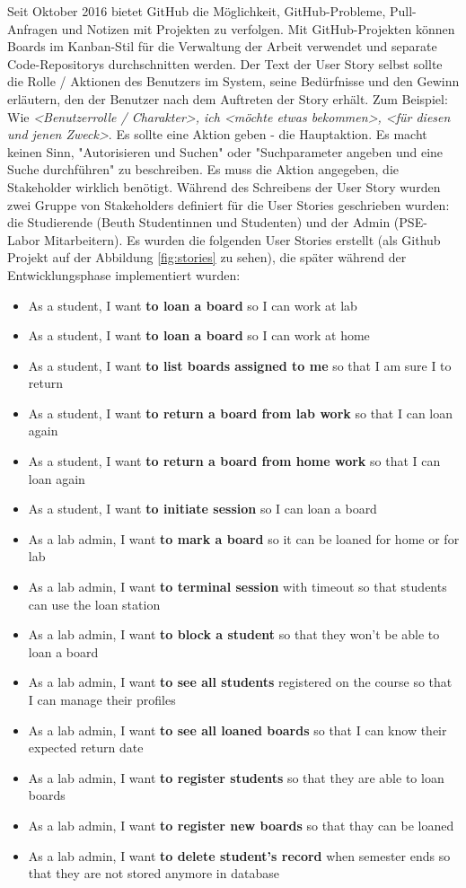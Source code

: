 Seit Oktober 2016 bietet GitHub die Möglichkeit, GitHub-Probleme, Pull-Anfragen und Notizen mit Projekten zu verfolgen\cite{website:18}. Mit GitHub-Projekten können Boards im Kanban-Stil für die Verwaltung der Arbeit verwendet und separate Code-Repositorys durchschnitten werden. Der Text der User Story selbst sollte die Rolle / Aktionen des Benutzers im System, seine Bedürfnisse und den Gewinn erläutern, den der Benutzer nach dem Auftreten der Story erhält. Zum Beispiel: Wie \textit{<Benutzerrolle / Charakter>, ich <möchte etwas bekommen>, <für diesen und jenen Zweck>}. Es sollte eine Aktion geben - die Hauptaktion. Es macht keinen Sinn, "Autorisieren und Suchen" oder "Suchparameter angeben und eine Suche durchführen" zu beschreiben. Es muss die Aktion angegeben, die Stakeholder wirklich benötigt. Während des Schreibens der User Story wurden zwei Gruppe von Stakeholders definiert für die User Stories geschrieben wurden: die Studierende (Beuth Studentinnen und Studenten) und der Admin (PSE-Labor Mitarbeitern). Es wurden die folgenden User Stories erstellt (als Github Projekt auf der Abbildung \ref*{fig:stories} zu sehen), die später während der Entwicklungsphase implementiert wurden:
\begin{itemize}
	\itemsep-1.2em 
	\item As a student, I want \textbf{to loan a board} so I can work at lab
	\item As a student, I want \textbf{to loan a board} so I can work at home
	\item As a student, I want \textbf{to list boards assigned to me} so that I am sure I to return
	\item As a student, I want \textbf{to return a board from lab work} so that I can loan again
	\item As a student, I want \textbf{to return a board from home work} so that I can loan again
	\item As a student, I want \textbf{to initiate session} so I can loan a board
	\item As a lab admin, I want \textbf{to mark a board} so it can be loaned for home or for lab
	\item As a lab admin, I want \textbf{to terminal session} with timeout so that students can use the loan station
	\item As a lab admin, I want \textbf{to block a student} so that they won't be able to loan a board
	\item As a lab admin, I want \textbf{to see all students} registered on the course so that I can manage their profiles
	\item As a lab admin, I want \textbf{to see all loaned boards} so that I can know their expected return date
	\item As a lab admin, I want \textbf{to register students} so that they are able to loan boards
	\item As a lab admin, I want \textbf{to register new boards} so that thay can be loaned
	\item As a lab admin, I want \textbf{to delete student's record} when semester ends so that they are not stored anymore in database
\end{itemize}

